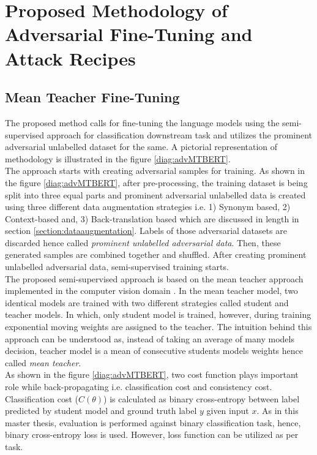 \documentclass[%
	BCOR=8mm, %
	DIV=12,
	toc=bibliography, %
	toc=listof, %
	oneside, %
	egregdoesnotlikesansseriftitles, %
	]{scrbook}
\begin{document}

\chapter{ Proposed Methodology of Adversarial Fine-Tuning and Attack Recipes}
\label{chapter:methodology}
\section{Mean Teacher Fine-Tuning}
\label{section:Meanteacher}
The proposed method calls for fine-tuning the language models using the semi-supervised approach for classification downstream task and utilizes the prominent adversarial unlabelled dataset for the same. A pictorial representation of methodology is illustrated in the figure \ref{diag:advMTBERT}.\\
The approach  starts with creating adversarial samples for training. As shown in the figure \ref{diag:advMTBERT}, after pre-processing, the training dataset is being split into three equal parts and prominent adversarial unlabelled data is created using three different data augmentation strategies i.e. 1) Synonym based, 2) Context-based and, 3) Back-translation based which are discussed in length in section \ref{section:dataaugmentation}. Labels of those adversarial datasets are discarded hence called \textit{prominent unlabelled adversarial data}. Then, these generated samples are combined together and shuffled. After creating prominent unlabelled adversarial data, semi-supervised training starts.\\
The proposed semi-supervised approach is based on the mean teacher approach implemented in the computer vision domain \cite{tarvainen_mean_2018}. In the mean teacher model, two identical models are trained with two different strategies called student and teacher models. In which, only student model is trained, however, during training exponential moving weights are assigned to the teacher. The intuition behind this approach can be understood as, instead of taking an average of many models decision, teacher model is a mean of consecutive students models weights hence called \textit{mean teacher}. \\
As shown in the figure \ref{diag:advMTBERT}, two cost function plays important role while back-propagating i.e. classification cost and consistency cost. Classification cost ($C(\theta)$) is calculated as binary cross-entropy between label predicted by student model and ground truth label $y$ given input $x$.  As in this master thesis, evaluation is performed against binary classification task, hence, binary cross-entropy loss is used. However, loss function can be utilized as per task.\\
\end{document}
